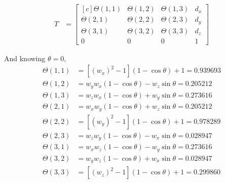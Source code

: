 \documentclass[onecolumn,10pt]{jhwhw}
\begin{document}
\begin{align*}
T &=
\begin{bmatrix*}[c]
\Theta \left(1, 1 \right ) & \Theta \left(1, 2 \right ) & \Theta \left(1, 3 \right ) & d_x \\
\Theta \left(2, 1 \right ) & \Theta \left(2, 2 \right ) & \Theta \left(2, 3 \right ) & d_y \\
\Theta \left(3, 1 \right ) & \Theta \left(3, 2 \right ) & \Theta \left(3, 3 \right ) & d_z \\
0 & 0 & 0 & 1
\end{bmatrix*}
\end{align*}

And knowing $\theta = 0,$
\begin{align*}
\Theta \left(1, 1 \right ) &= [\left ( w_x \right )^2 - 1 ] \left ( 1 - \cos \theta \right ) + 1 = 0.939693\\
\Theta \left(1, 2 \right ) &= w_y w_x \left ( 1 - \cos \theta \right ) - w_z \sin \theta = 0.205212\\
\Theta \left(1, 3 \right ) &= w_z w_x \left ( 1 - \cos \theta \right ) + w_y \sin \theta = 0.273616\\
\Theta \left(2, 1 \right ) &= w_x w_y \left ( 1 - \cos \theta \right ) + w_z \sin \theta = 0.205212\\
\Theta \left(2, 2 \right ) &= [\left ( w_y \right )^2 - 1 ] \left ( 1 - \cos \theta \right ) + 1 = 0.978289\\
\Theta \left(2, 3 \right ) &= w_z w_y \left ( 1 - \cos \theta \right ) - w_x \sin \theta = 0.028947\\
\Theta \left(3, 1 \right ) &= w_x w_z \left ( 1 - \cos \theta \right ) - w_y \sin \theta = 0.273616\\
\Theta \left(3, 2 \right ) &= w_y w_z \left ( 1 - \cos \theta \right ) + w_x \sin \theta = 0.028947\\
\Theta \left(3, 3 \right ) &= [\left ( w_z \right )^2 - 1 ] \left ( 1 - \cos \theta \right ) + 1 = 0.299860\\
\end{align*}

\end{document}
